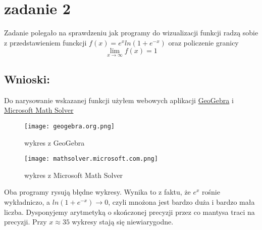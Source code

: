 \section{zadanie 2}
Zadanie polegało na sprawdzeniu jak programy do wizualizacji funkcji radzą sobie z przedstawieniem funckcji \(f(x) = e^x ln(1+e^{-x})\) oraz policzenie granicy \[\lim_{x \to \infty} f(x) = 1\] 

\subsection{Wnioski:}
Do narysowanie wskazanej funkcji użyłem webowych aplikacji \href{https://www.geogebra.org/calculator}{GeoGebra} i \href{https://mathsolver.microsoft.com/pl}{Microsoft Math Solver}
\begin{figure}[h]
  \centering
  \texttt{[image: geogebra.org.png]}
  \caption{wykres z GeoGebra}
  \label{fig:geogebra}
\end{figure}
\begin{figure}[h]
  \centering
  \texttt{[image: mathsolver.microsoft.com.png]}
  \caption{wykres z Microsoft Math Solver}
  \label{fig:microsoftmathsolver}
\end{figure}

Oba programy rysują błędne wykresy. Wynika to z faktu, że \(e^x\) rośnie wykładniczo, a \(ln(1+e^{-x}) \to 0\), czyli mnożona jest bardzo duża i bardzo mała liczba. Dysponyjemy arytmetyką o skończonej precyzji przez co mantysa traci na precyzji. Przy \(x \approx 35\) wykresy stają się niewiarygodne.
